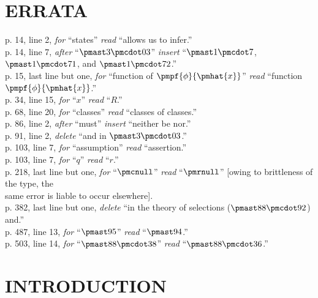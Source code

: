 \documentclass[letterpaper,12pt,openany,leqno]{book}
\newcommand{\pagefirst}[1]{\marginnote[\boxed{\text{#1}}]{\boxed{\text{#1}}}}
\begin{document}
\chapter*{\centering \Large ERRATA} \thispagestyle{empty}
p. 14, line 2, \textit{for} ``states'' \textit{read} ``allows us to infer.'' \\
p. 14, line 7, \textit{after} ``$\pmast3\pmcdot03$'' \textit{insert} ``$\pmast1\pmcdot7$, $\pmast1\pmcdot71$, and $\pmast1\pmcdot72$.''\\
p. 15, last line but one, \textit{for} ``function of $\pmpf{\phi}{\pmhat{x}}$'' \textit{read} ``function $\pmpf{\phi}{\pmhat{x}}$.''\\
p. 34, line 15, \textit{for} ``$x$'' \textit{read} ``$R$.''\\
p. 68, line 20, \textit{for} ``classes'' \textit{read} ``classes of classes.''\\
p. 86, line 2, \textit{after} ``must'' \textit{insert} ``neither be nor.''\\
p. 91, line 2, \textit{delete} ``and in $\pmast3\pmcdot03$.''\\
p. 103, line 7, \textit{for} ``assumption'' \textit{read} ``assertion.''\\
p. 103, line 7, \textit{for} ``$q$'' \textit{read} ``$r$.''\\
p. 218, last line but one, \textit{for} ``$\pmcnull$'' \textit{read} ``$\pmrnull$'' [owing to brittleness of the type, the \\
\indent \indent \indent same error is liable to occur elsewhere].\\
p. 382, last line but one, \textit{delete} ``in the theory of selections ($\pmast88\pmcdot92$) and.''\\
p. 487, line 13, \textit{for} ``$\pmast95$'' \textit{read} ``$\pmast94$.''\\
p. 503, line 14, \textit{for} ``$\pmast88\pmcdot38$'' \textit{read} ``$\pmast88\pmcdot36$.''

\mainmatter

\chapter*{\centering INTRODUCTION}  \pagefirst{1}
\end{document}
